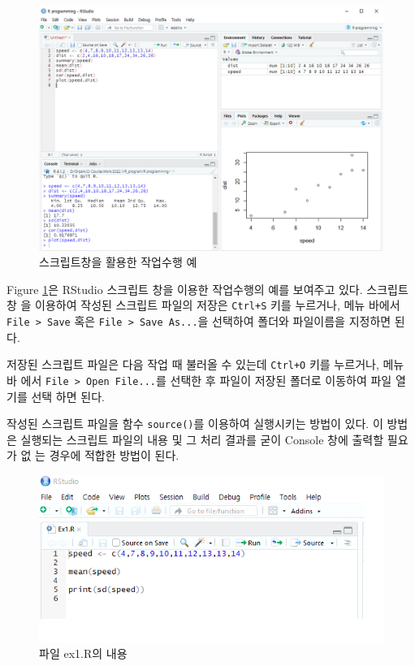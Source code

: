 \documentclass[
]{book}
\begin{document}
\begin{figure}
\includegraphics[width=14.6in]{Figure/ex_script} \caption{스크립트창을 활용한 작업수행 예}\label{fig:ex-script}
\end{figure}

Figure \ref{fig:ex-script}은 RStudio 스크립트 창을 이용한 작업수행의
예를 보여주고 있다. 스크립트 창 을 이용하여 작성된 스크립트 파일의
저장은 \texttt{Ctrl+S} 키를 누르거나, 메뉴 바에서 \texttt{File\ \textgreater{}\ Save} 혹은
\texttt{File\ \textgreater{}\ Save\ As...}을 선택하여 폴더와 파일이름을 지정하면 된다.

저장된 스크립트 파일은 다음 작업 때 불러올 수 있는데 \texttt{Ctrl+O} 키를
누르거나, 메뉴 바 에서 \texttt{File\ \textgreater{}\ Open\ File...}를 선택한 후 파일이 저장된
폴더로 이동하여 파일 열기를 선택 하면 된다.

작성된 스크립트 파일을 함수 \texttt{source()}를 이용하여 실행시키는 방법이
있다. 이 방법은 실행되는 스크립트 파일의 내용 및 그 처리 결과를 굳이
Console 창에 출력할 필요가 없 는 경우에 적합한 방법이 된다.

\begin{figure}
\includegraphics[width=7.99in]{Figure/ex1_content} \caption{파일 ex1.R의 내용}\label{fig:ex1-content}
\end{figure}
\end{document}
